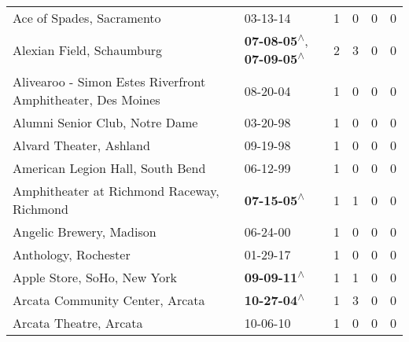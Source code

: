 \begin{supertabular}{p{0.4\textwidth}p{0.3\textwidth}p{0.05\textwidth}p{0.05\textwidth}p{0.05\textwidth}p{0.05\textwidth}}
                                                    Ace of Spades, Sacramento &                                                                  03-13-14\textsuperscript{} &  1 &  0 &  0 &  0 \\
                                                    Alexian Field, Schaumburg &    \textbf{07-08-05\textsuperscript{$\wedge$}}, \textbf{07-09-05\textsuperscript{$\wedge$}} &  2 &  3 &  0 &  0 \\
                  Alivearoo - Simon Estes Riverfront Amphitheater, Des Moines &                                                                  08-20-04\textsuperscript{} &  1 &  0 &  0 &  0 \\
                                               Alumni Senior Club, Notre Dame &                                                                  03-20-98\textsuperscript{} &  1 &  0 &  0 &  0 \\
                                                      Alvard Theater, Ashland &                                                                  09-19-98\textsuperscript{} &  1 &  0 &  0 &  0 \\
                                             American Legion Hall, South Bend &                                                                  06-12-99\textsuperscript{} &  1 &  0 &  0 &  0 \\
                                   Amphitheater at Richmond Raceway, Richmond &                                                 \textbf{07-15-05\textsuperscript{$\wedge$}} &  1 &  1 &  0 &  0 \\
                                                     Angelic Brewery, Madison &                                                                  06-24-00\textsuperscript{} &  1 &  0 &  0 &  0 \\
                                                         Anthology, Rochester &                                                                  01-29-17\textsuperscript{} &  1 &  0 &  0 &  0 \\
                                                  Apple Store, SoHo, New York &                                                 \textbf{09-09-11\textsuperscript{$\wedge$}} &  1 &  1 &  0 &  0 \\
                                              Arcata Community Center, Arcata &                                                 \textbf{10-27-04\textsuperscript{$\wedge$}} &  1 &  3 &  0 &  0 \\
                                                       Arcata Theatre, Arcata &                                                                  10-06-10\textsuperscript{} &  1 &  0 &  0 &  0 \\

\end{supertabular}
